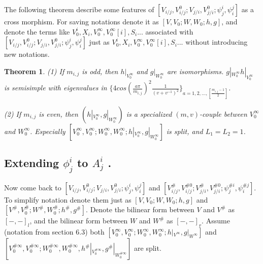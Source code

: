\def\CTEXPreproc{Created by ctex v0.2.12, don't edit!}\documentclass[11pt]{article}
\newtheorem{thm}{Theorem}[section]
\begin{document}
The following theorem describe some features of $ [ V_{i/j} , V^{0}_{i/j} ; V_{j/i}, V^0 _{j/i} ; \psi^i _j , \psi^j _i     ]   $ as a cross morphism. For saving notations denote it as $[V, V_0 ; W, W_0 ; h,g   ]$, and denote the terms like $V^i _0 , X_i , V^{\infty}_0 ,
  V^{\infty}_0 [i], S_i ...$ associated with $ [ V_{i/j} , V^{0}_{i/j} ; V_{j/i}, V^0 _{j/i} ; \psi^i _j , \psi^j _i     ]   $ just as  $V^i _0 , X_i , V^{\infty}_0 ,  V^{\infty}_0 [i], S_i ...$ without introducing new notations.

  \begin{thm}
  (1) If $m_{i,j}$ is odd, then $h|_{V^{\infty}_0 }$ and $g|_{ W^{\infty}_0 }$ are isomorphisms. $g|_{ W^{\infty}_0 } h|_{V^{\infty}_0}$ is semisimple with eigenvalues in  $  \{ 4 cos(\frac{a\pi}{m_{i,j}})^2 \frac{1}{(v+v^{-1})^2} \} _{a=1,2,...,[\frac{m_{i,j}-1}{2} ]}  $.

  (2) If $m_{i,j}$ is even, then $( h|_{V^{\infty}_0 },g|_{ W^{\infty}_0 }   )$ is a specialized $(m,v)$-couple between $ V^{\infty}_0 $ and $W^{\infty}_0 $. Especially $ [V^{\infty}_0 , V^{\infty}_0 ; W^{\infty} _0 , W^{\infty}_0 ; h|_{V^{\infty}_0 } , g|_{W^{\infty}_0}  ] $ is split,  and $L_1 =L_2 =1$.

  \end{thm}










\subsection{Extending $\phi^i _j$ to $A^i _j$ .}


Now come back to $ [ V_{i/j} , V^{0}_{i/j} ; V_{j/i}, V^0 _{j/i} ; \psi^i _j , \psi^j _i     ]   $ and
$[ V^{\#} _{i/j} , V^{\# 0}_{i/j} ; V^{\#} _{j/i}, V^{\# 0} _{j/i} ; \psi^{\# i} _j , \psi^{\# j} _i     ] $.
 To simplify notation denote them  just as
$[V,V_0 ; W, W_0 ; h,g  ]$ and
 $[V^{\#}, V^{\#}_0 ; W^{\#}, W^{\#}_0 ; h^{\#} ,g^{\#}  ] $. Denote the bilinear form between $V$ and $V^{\#}$ as $[-,-]_l$, and the bilinear form between $W$ and $W^{\#}$ as $[-,-]_r$. Assume (notation from section 6.3) both  $[V^{\infty}_0 ,V^{\infty}_0 ; W^{\infty}_0, W^{\infty}_0 ; h|_{V^{\infty}},g|_{W^{\infty}}  ]$ and
$[V^{\# \infty}_0 , V^{\# \infty}_0 ; W^{\# \infty}_0 , W^{\# \infty}_0 , h^{\#}|_{V^{\# \infty}_0}, g^{\#}|_{W^{\# \infty}_0}   ]$ are split.
\end{document}
